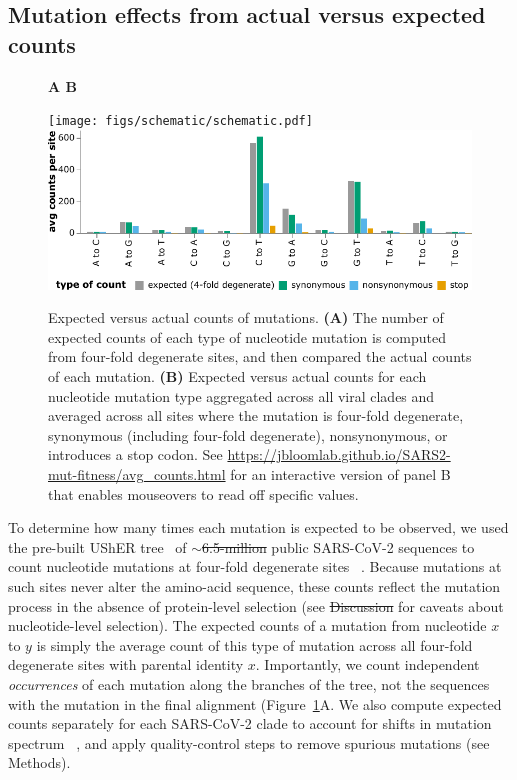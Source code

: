 \documentclass[9pt,twocolumn,twoside]{gsajnl_modified}
\providecommand{\DIFadd}[1]{{\protect\color{blue}\uwave{#1}}} %
\providecommand{\DIFdel}[1]{{\protect\color{red}\sout{#1}}}                      %
\providecommand{\DIFaddbegin}{} %
\providecommand{\DIFaddend}{} %
\providecommand{\DIFdelbegin}{} %
\providecommand{\DIFdelend}{} %
\begin{document}
\subsection{Mutation effects from actual versus expected counts}

\begin{figure}
{\bf \Large A \hspace{0.47\linewidth} B}

\texttt{[image: figs/schematic/schematic.pdf]}
\hspace{0.02\linewidth}
\includegraphics[width=0.5\linewidth,valign=t]{figs/avg_counts.pdf}
\caption{
Expected versus actual counts of mutations.
{\bf (A)}
The number of expected counts of each type of nucleotide mutation is computed from four-fold degenerate sites, and then compared the actual counts of each mutation.
{\bf (B)}
Expected versus actual counts for each nucleotide mutation type aggregated across all viral clades and averaged across all sites where the mutation is four-fold degenerate, synonymous (including four-fold degenerate), nonsynonymous, or introduces a stop codon.
See \url{https://jbloomlab.github.io/SARS2-mut-fitness/avg_counts.html} for an interactive version of panel B that enables mouseovers to read off specific values.
\label{fig:expected_vs_actual}
}
\end{figure}

To determine how many times each mutation is expected to be observed, we used the pre-built UShER tree~\citep{mcbroome2021daily,turakhia2021ultrafast,lanfear2020} of $\sim$\DIFdelbegin \DIFdel{6.5-million }\DIFdelend \DIFaddbegin \DIFadd{7-million }\DIFaddend public SARS-CoV-2 sequences to count nucleotide mutations at four-fold degenerate sites~\DIFdelbegin %
\DIFdelend \DIFaddbegin \citep[Figure~\ref{fig:expected_vs_actual}A;][]{bloom2023evolution}\DIFaddend .
Because mutations at such sites never alter the amino-acid sequence, these counts reflect the mutation process in the absence of protein-level selection (see \DIFdelbegin \DIFdel{Discussion }\DIFdelend \DIFaddbegin \DIFadd{below }\DIFaddend for caveats about nucleotide-level selection).
The expected counts of a mutation from nucleotide $x$ to $y$ is simply the average count of this type of mutation across all four-fold degenerate sites with parental identity $x$.
Importantly, we count independent \emph{occurrences} of each mutation along the branches of the tree, not the sequences with the mutation in the final alignment (Figure~\ref{fig:expected_vs_actual}A.
We also compute expected counts separately for each SARS-CoV-2 clade to account for shifts in mutation spectrum~\DIFdelbegin %
\DIFdelend \DIFaddbegin \citep{bloom2023evolution,ruis2022mutational}\DIFaddend , and apply quality-control steps to remove spurious mutations (see Methods).
\end{document}
